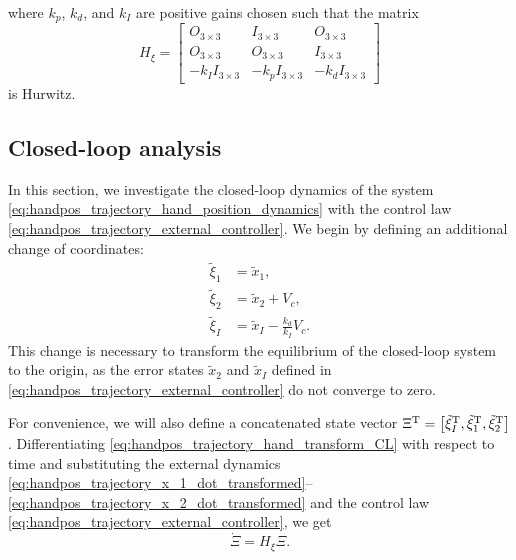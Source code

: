\noindent where $k_p$, $k_d$, and $k_I$ are positive gains chosen such that the matrix
\begin{equation}
    H_{\xi}
    =
    \begin{bmatrix}
        O_{3 \times 3} & I_{3 \times 3} & O_{3 \times 3} \\ O_{3 \times 3} & O_{3 \times 3} & I_{3 \times 3} \\ -k_I I_{3 \times 3} & -k_p I_{3 \times 3} & -k_d I_{3 \times 3}
    \end{bmatrix} \label{eq:handpos_trajectory_H_xi}
\end{equation}
is Hurwitz.

\subsection{Closed-loop analysis}
In this section, we investigate the closed-loop dynamics of the system \eqref{eq:handpos_trajectory_hand_position_dynamics} with the control law \eqref{eq:handpos_trajectory_external_controller}.
We begin by defining an additional change of coordinates:
\begin{subequations}
    \begin{align}
        \tilde{\xi}_1 &= \tilde{x}_1, \\
        \tilde{\xi}_2 &= \tilde{x}_2 + V_c, \\
        \tilde{\xi}_I &= \tilde{x}_I - \frac{k_d}{k_I}V_c.
    \end{align} \label{eq:handpos_trajectory_hand_transform_CL}
\end{subequations}
This change is necessary to transform the equilibrium of the closed-loop system to the origin, as the error states $\tilde{x}_2$ and $\tilde{x}_I$ defined in \eqref{eq:handpos_trajectory_external_controller} do not converge to zero.

For convenience, we will also define a concatenated state vector $\Xi^{\mathrm{T}} = \left[{\tilde{\xi}}_I^{\mathrm{T}}, {\tilde{\xi}}_1^{\mathrm{T}}, {\tilde{\xi}}_2^{\mathrm{T}}\right]$.
Differentiating \eqref{eq:handpos_trajectory_hand_transform_CL} with respect to time and substituting the external dynamics \eqref{eq:handpos_trajectory_x_1_dot_transformed}--\eqref{eq:handpos_trajectory_x_2_dot_transformed} and the control law \eqref{eq:handpos_trajectory_external_controller}, we get
\begin{equation}
    \dot{\Xi} = H_{\xi} \Xi. \label{eq:handpos_trajectory_external_dynamics}
\end{equation}

